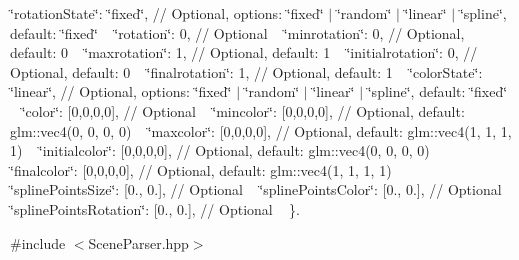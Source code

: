  \char`\"{}rotation\+State\char`\"{}\+: \char`\"{}fixed\char`\"{}, // Optional, options\+: \char`\"{}fixed\char`\"{} $\vert$ \char`\"{}random\char`\"{} $\vert$ \char`\"{}linear\char`\"{} $\vert$ \char`\"{}spline\char`\"{}, default\+: \char`\"{}fixed\char`\"{} ~\newline
 \char`\"{}rotation\char`\"{}\+: 0, // Optional ~\newline
 \char`\"{}minrotation\char`\"{}\+: 0, // Optional, default\+: 0 ~\newline
 \char`\"{}maxrotation\char`\"{}\+: 1, // Optional, default\+: 1 ~\newline
 \char`\"{}initialrotation\char`\"{}\+: 0, // Optional, default\+: 0 ~\newline
 \char`\"{}finalrotation\char`\"{}\+: 1, // Optional, default\+: 1 ~\newline
 \char`\"{}color\+State\char`\"{}\+: \char`\"{}linear\char`\"{}, // Optional, options\+: \char`\"{}fixed\char`\"{} $\vert$ \char`\"{}random\char`\"{} $\vert$ \char`\"{}linear\char`\"{} $\vert$ \char`\"{}spline\char`\"{}, default\+: \char`\"{}fixed\char`\"{} ~\newline
 \char`\"{}color\char`\"{}\+: \mbox{[}0,0,0,0\mbox{]}, // Optional ~\newline
 \char`\"{}mincolor\char`\"{}\+: \mbox{[}0,0,0,0\mbox{]}, // Optional, default\+: glm\+::vec4(0, 0, 0, 0) ~\newline
 \char`\"{}maxcolor\char`\"{}\+: \mbox{[}0,0,0,0\mbox{]}, // Optional, default\+: glm\+::vec4(1, 1, 1, 1) ~\newline
 \char`\"{}initialcolor\char`\"{}\+: \mbox{[}0,0,0,0\mbox{]}, // Optional, default\+: glm\+::vec4(0, 0, 0, 0) ~\newline
 ~\newline
 \char`\"{}finalcolor\char`\"{}\+: \mbox{[}0,0,0,0\mbox{]}, // Optional, default\+: glm\+::vec4(1, 1, 1, 1) ~\newline
 ~\newline
 \char`\"{}spline\+Points\+Size\char`\"{}\+: \mbox{[}0., 0.\mbox{]}, // Optional ~\newline
 \char`\"{}spline\+Points\+Color\char`\"{}\+: \mbox{[}0., 0.\mbox{]}, // Optional ~\newline
 \char`\"{}spline\+Points\+Rotation\char`\"{}\+: \mbox{[}0., 0.\mbox{]}, // Optional ~\newline
 \}.  




{\ttfamily \#include $<$Scene\+Parser.\+hpp$>$}

